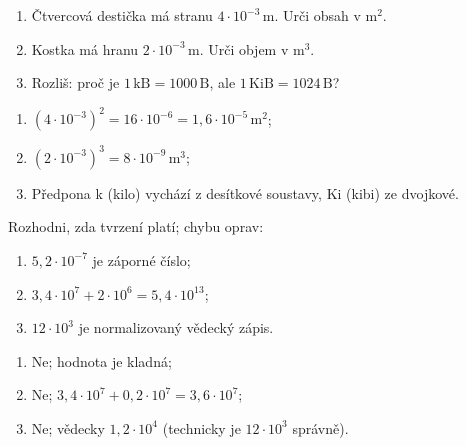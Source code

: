 \documentclass[11pt,a4paper]{article}
\begin{document}
\begin{zadaniReseniBox}[breakable=false,title={Rozšíření 1}]
\begin{enumerate}[label=\alph*)]
\item Čtvercová destička má stranu $4\cdot10^{-3}\,\mathrm m$. Urči obsah v $\mathrm{m^2}$.
\item Kostka má hranu $2\cdot10^{-3}\,\mathrm m$. Urči objem v $\mathrm{m^3}$.
\item Rozliš: proč je $1\,\mathrm{kB}=1000\,\mathrm B$, ale $1\,\mathrm{KiB}=1024\,\mathrm B$?
\end{enumerate}
\tcblower
\begin{enumerate}[label=\alph*)]
\item $(4\cdot10^{-3})^2=16\cdot10^{-6}=\boxed{1{,}6\cdot10^{-5}\,\mathrm{m^2}}$;
\item $(2\cdot10^{-3})^3=8\cdot10^{-9}\,\mathrm{m^3}$;
\item Předpona k (kilo) vychází z desítkové soustavy, Ki (kibi) ze dvojkové.
\end{enumerate}
\end{zadaniReseniBox}
\begin{zadaniReseniBox}[breakable=false,title={Rozšíření 2}]
Rozhodni, zda tvrzení platí; chybu oprav:
\begin{enumerate}[label=\alph*)]
\item $5{,}2\cdot10^{-7}$ je záporné číslo;
\item $3{,}4\cdot10^7+2\cdot10^6=5{,}4\cdot10^{13}$;
\item $12\cdot10^3$ je normalizovaný vědecký zápis.
\end{enumerate}
\tcblower
\begin{enumerate}[label=\alph*)]
\item Ne; hodnota je kladná;
\item Ne; $3{,}4\cdot10^7+0{,}2\cdot10^7=3{,}6\cdot10^7$;
\item Ne; vědecky $1{,}2\cdot10^4$ (technicky je $12\cdot10^3$ správně).
\end{enumerate}
\end{zadaniReseniBox}
\end{document}
